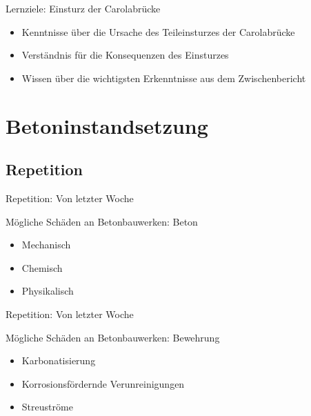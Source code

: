 \begin{frame}{Lernziele: Einsturz der Carolabrücke}
    \begin{myLernziele}
        \begin{itemize}
            \item[\textbullet] Kenntnisse über die Ursache des Teileinsturzes der Carolabrücke
            \item[\textbullet] Verständnis für die Konsequenzen des Einsturzes
            \item[\textbullet] Wissen über die wichtigsten Erkenntnisse aus dem Zwischenbericht
        \end{itemize}
    \end{myLernziele}
\end{frame}




\section{Betoninstandsetzung}
\BlueSectionSlide
\subsection{Repetition}
\begin{frame}{Repetition: Von letzter Woche}
	\begin{block}{Mögliche Schäden an Betonbauwerken: Beton}
		\begin{itemize}
			\item[\textbullet] Mechanisch
			\item[\textbullet] Chemisch
			\item[\textbullet] Physikalisch
		\end{itemize}
	\end{block}
\end{frame}
\begin{frame}{Repetition: Von letzter Woche}
	\begin{block}{Mögliche Schäden an Betonbauwerken: Bewehrung}
		\begin{itemize}
			\item[\textbullet] Karbonatisierung
			\item[\textbullet] Korrosionsfördernde Verunreinigungen
			\item[\textbullet] Streuströme
		\end{itemize}
	\end{block}
\end{frame}

